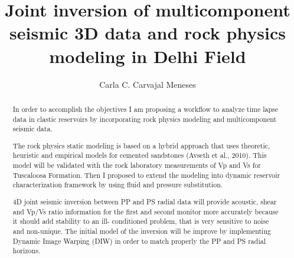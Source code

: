 \documentclass[letterpaper,12pt]{article}
\title{Joint inversion of multicomponent seismic 3D data and rock physics modeling in Delhi Field}
\author{Carla C. Carvajal Meneses}
\begin{document}
\frontmatter

\maketitle
\newpage

\makecopyright{\the\year}
\newpage


\makesubmittal
\newpage


\begin{abstract}
In order to accomplish the objectives I am proposing a workflow to analyze
  time lapse data in clastic reservoirs by incorporating rock physics modeling
 and multicomponent seismic data.
   
The rock physics static modeling is based on a hybrid  approach that uses theoretic,
 heuristic and empirical models for cemented sandstones (Avseth et al., 2010). 
This model will be validated with the rock laboratory measurements of Vp and Vs for
 Tuscaloosa Formation.  Then I proposed to extend the modeling into dynamic reservoir 
 characterization framework by using fluid and pressure substitution.

4D joint seismic inversion between PP and PS radial data will provide acoustic, shear 
and Vp/Vs ratio information for the first and second monitor more accurately because it 
should add stability to an ill- conditioned problem, that is very sensitive to noise and non-unique.
The initial model of the inversion will be improve by implementing  Dynamic Image Warping
 (DIW) in order to match properly the PP and PS radial horizons.


\end{abstract}

\newpage


\tableofcontents

\newpage

\listoffiguresandtables

\newpage



\end{document}
